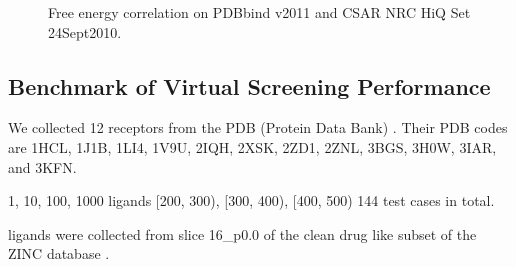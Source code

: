 \documentclass[10pt,conference,compsocconf]{../IEEEtran}
\begin{document}
\begin{figure}
\centering
{}
\caption{Free energy correlation on PDBbind v2011 and CSAR NRC HiQ Set 24Sept2010.}
\label{fig:FECorrelation}
\end{figure}

\subsection{Benchmark of Virtual Screening Performance}

We collected 12 receptors from the PDB (Protein Data Bank) \cite{540,537}. Their PDB codes are 1HCL, 1J1B, 1LI4, 1V9U, 2IQH, 2XSK, 2ZD1, 2ZNL, 3BGS, 3H0W, 3IAR, and 3KFN.

1, 10, 100, 1000 ligands
[200, 300), [300, 400), [400, 500)
144 test cases in total.

ligands were collected from slice 16\_p0.0 of the clean drug like subset of the ZINC database \cite{532}.
\end{document}
